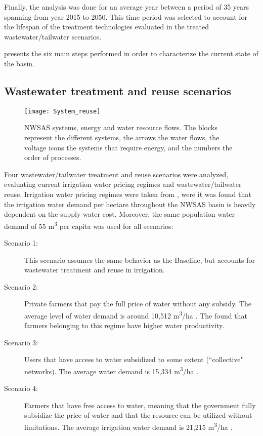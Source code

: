 Finally, the analysis was done for an average year between a period of 35 years spanning from year 2015 to 2050. This time period was selected to account for the lifespan of the treatment technologies evaluated in the treated wastewater/tailwater scenarios.

 presents the six main steps performed in order to characterize the current state of the basin.

\subsection{Wastewater treatment and reuse scenarios}
\begin{figure*}[!b]
	\centering
	\texttt{[image: System\_reuse]}
	\caption{NWSAS systems, energy and water resource flows. The blocks represent the different systems, the arrows the water flows, the voltage icons the systems that require energy, and the numbers the order of processes.}
	\label{fig:systemreuse}
\end{figure*}
Four wastewater/tailwater treatment and reuse scenarios were analyzed, evaluating current irrigation water pricing regimes and wastewater/tailwater reuse. Irrigation water pricing regimes were taken from \cite{Socioeconomicaspectsirrigation2014}, were it was found that the irrigation water demand per hectare throughout the NWSAS basin is heavily dependent on the supply water cost. Moreover, the same population water demand of 55 m\textsuperscript{3} per capita was used for all scenarios:

\begin{description}
\item[Scenario 1:] This scenario assumes the same behavior as the Baseline, but accounts for wastewater treatment and reuse in irrigation.
\item[Scenario 2:] Private farmers that pay the full price of water without any subsidy. The average level of water demand is around 10,512 m\textsuperscript{3}/ha \cite{Socioeconomicaspectsirrigation2014}. The \citet{Socioeconomicaspectsirrigation2014} found that farmers belonging to this regime have higher water productivity.
\item[Scenario 3:] Users that have access to water subsidized to some extent (``collective" networks). The average water demand is 15,334 m\textsuperscript{3}/ha \cite{Socioeconomicaspectsirrigation2014}.
\item[Scenario 4:] Farmers that have free access to water, meaning that the government fully subsidize the price of water and that the resource can be utilized without limitations. The average irrigation water demand is 21,215 m\textsuperscript{3}/ha \cite{Socioeconomicaspectsirrigation2014}.
\end{description}

